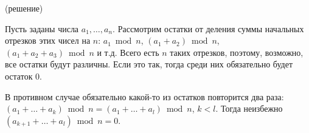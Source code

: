 \begin{itemize}
(решение)

\itC Пусть заданы числа $a_1, \dots, a_n$. Рассмотрим остатки от деления суммы начальных 
отрезков этих чисел на $n$:
$a_1 \bmod n$, $(a_1+a_2) \bmod n$, $(a_1+a_2+a_3) \bmod n$ и т.д. 
Всего есть $n$ таких отрезков, поэтому, возможно, все остатки будут различны.
Если это так, тогда среди них обязательно будет остаток 0. 

В противном случае обязательно какой-то из остатков повторится два раза:
$(a_1 + \dots + a_k) \bmod n = (a_1 + \dots + a_l) \bmod n$, $k < l$. Тогда
неизбежно $(a_{k+1} + \dots + a_l) \bmod n = 0$.

\end{itemize}